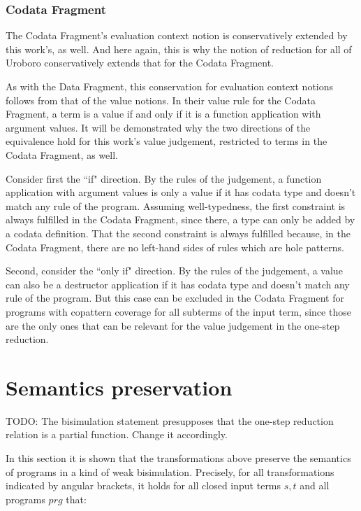 \documentclass[11pt]{article} %
\begin{document}
\subsubsection{Codata Fragment}

The Codata Fragment's evaluation context notion is conservatively extended by this work's, as well. And here again, this is why the notion of reduction for all of Uroboro conservatively extends that for the Codata Fragment.

As with the Data Fragment, this conservation for evaluation context notions follows from that of the value notions. In their value rule for the Codata Fragment, a term is a value if and only if it is a function application with argument values. It will be demonstrated why the two directions of the equivalence hold for this work's value judgement, restricted to terms in the Codata Fragment, as well.

Consider first the ``if" direction. By the rules of the judgement, a function application with argument values is only a value if it has codata type and doesn't match any rule of the program. Assuming well-typedness, the first constraint is always fulfilled in the Codata Fragment, since there, a type can only be added by a codata definition. That the second constraint is always fulfilled because, in the Codata Fragment, there are no left-hand sides of rules which are hole patterns.

Second, consider the ``only if" direction. By the rules of the judgement, a value can also be a destructor application if it has codata type and doesn't match any rule of the program. But this case can be excluded in the Codata Fragment for programs with copattern coverage for all subterms of the input term, since those are the only ones that can be relevant for the value judgement in the one-step reduction.

\section{Semantics preservation}

TODO: The bisimulation statement presupposes that the one-step reduction relation is a partial function. Change it accordingly.

In this section it is shown that the transformations above preserve the semantics of programs in a kind of weak bisimulation. Precisely, for all transformations indicated by angular brackets, it holds for all closed input terms $s, t$ and all programs $prg$ that:
\end{document}
